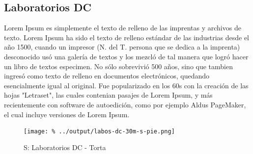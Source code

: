 \documentclass[final,narroweqnarray,inline]{ieee}
\begin{document}
  \subsection{Laboratorios DC}

Lorem Ipsum es simplemente el texto de relleno de las imprentas y archivos de texto. Lorem Ipsum ha sido el texto de relleno estándar de las industrias desde el año 1500, cuando un impresor (N. del T. persona que se dedica a la imprenta) desconocido usó una galería de textos y los mezcló de tal manera que logró hacer un libro de textos especimen. No sólo sobrevivió 500 años, sino que tambien ingresó como texto de relleno en documentos electrónicos, quedando esencialmente igual al original. Fue popularizado en los 60s con la creación de las hojas "Letraset", las cuales contenian pasajes de Lorem Ipsum, y más recientemente con software de autoedición, como por ejemplo Aldus PageMaker, el cual incluye versiones de Lorem Ipsum.


    \begin{figure}[h]\begin{center}
      \texttt{[image: \%
      ../output/labos-dc-30m-s-pie.png]}
      \vspace{-3em}
      \caption{S: Laboratorios DC - Torta}
      \label{labos-dc-30m-s-pie}
    \end{center}\end{figure}
\end{document}
